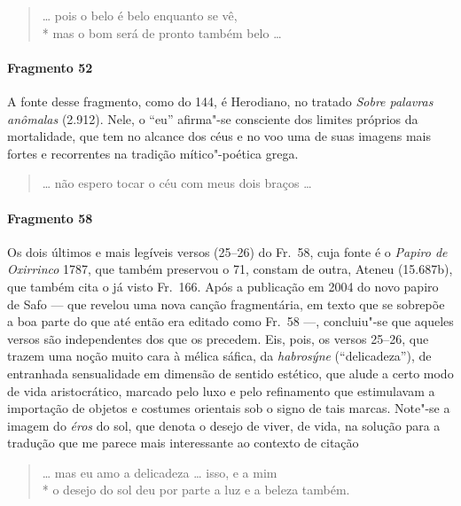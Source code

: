 \begin{verse}
\ldots{} pois o belo é belo enquanto se vê,\\*
mas o bom será de pronto também belo \ldots{}
\end{verse}

\paragraph{Fragmento 52}

{\small A fonte desse fragmento, como do 144, é Herodiano, no tratado \textit{Sobre
palavras anômalas} (2.912). Nele, o “eu” afirma"-se consciente dos limites próprios da
mortalidade, que tem no alcance dos céus e no voo uma de suas imagens mais
fortes e recorrentes na tradição mítico"-poética grega.}

\begin{verse}
\ldots{} não espero tocar o céu com meus dois \qb{}braços \ldots{}
\end{verse}

\paragraph{Fragmento 58}

{\small Os dois últimos e mais legíveis versos (25--26) do Fr.~58, cuja fonte é o
\textit{Papiro de Oxirrinco }1787, que também preservou o 71, constam de outra, Ateneu (15.687b), que também cita o já visto Fr.~166. Após a publicação em 2004 do
novo papiro de Safo --- que revelou uma nova canção fragmentária, em texto que se
sobrepõe a boa parte do que até então era editado como Fr.~58 ---, concluiu"-se que aqueles
versos são independentes dos que os precedem. Eis, pois, os versos 25--26, que
trazem uma noção muito cara à mélica sáfica, da \textit{habrosýne}
(``delicadeza”), de entranhada sensualidade em dimensão de sentido
estético, que alude a certo modo de vida aristocrático, marcado pelo luxo e pelo
refinamento que estimulavam a importação de objetos e costumes orientais
sob o signo de tais marcas. Note"-se a imagem do \textit{éros} do sol, que denota o desejo de viver, de vida, na solução para a tradução que me parece mais interessante ao contexto de citação}

\begin{verse}
\ldots{} mas eu amo a delicadeza \ldots{} isso, e a mim \\*
o desejo do sol deu por parte a luz e a beleza \qb{}também.
\end{verse}

